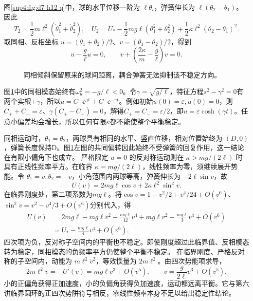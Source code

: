 \begin{solution}
图\ref{sup4:fig:d7-h12-q}中，球的水平位移一阶为 $\ell\theta_i$，弹簧伸长为 $\ell(\theta_2-\theta_1)$。因此
\[
T_2=\frac12m\ell^2(\dot\theta_1^2+\dot\theta_2^2),\quad
U_2=U_*-\frac12mg\ell(\theta_1^2+\theta_2^2)
+\frac12\kappa\ell^2(\theta_2-\theta_1)^2.
\]
取同相、反相坐标 $u=(\theta_1+\theta_2)/2$、$v=(\theta_1-\theta_2)/2$，得到
\[
\ddot u-\frac g\ell u=0,\qquad
\ddot v+\left(\frac{2\kappa}{m}-\frac g\ell\right)v=0.
\]
\begin{figure}[H]\centering
{}
\caption{同相倾斜保留原来的球间距离，耦合弹簧无法抑制该不稳定方向。}\label{sup4:fig:d7-h12-s}
\end{figure}
图\ref{sup4:fig:d7-h12-s}中的同相模态始终有$\omega_u^2=-g/\ell<0$。令$\gamma=\sqrt{g/\ell}$，特征方程$s^2-\gamma^2=0$有两个实根$\pm\gamma$，所以$u=C_+\ee^{\gamma t}+C_-\ee^{-\gamma t}$。例如初始$u(0)=\varepsilon,\dot u(0)=0$，则$C_++C_-=\varepsilon$、$\gamma(C_+-C_-)=0$，解得$C_+=C_-=\varepsilon/2$，即$u=\varepsilon\cosh(\gamma t)$。任意小偏差均会增长，所以任何有限$\kappa$都不能使整个平衡稳定。

同相运动时，$\theta_1=\theta_2$，两球具有相同的水平、竖直位移，相对位置始终为 $(D,0)$，弹簧长度保持D。图\ref{sup4:fig:d7-h12-s}左图的共同偏转因此始终不受弹簧的回复作用，这一结论在有限小偏角下也成立。
严格限定 $u=0$ 的反对称运动则在 $\kappa>mg/(2\ell)$ 时具有正线性频率平方。在临界 $\kappa=mg/(2\ell)$，线性频率为零，须继续展开势能。令 $\theta_1=v,\theta_2=-v$，小角范围内两球等高，弹簧伸长为 $-2\ell\sin v$，故
\[
U(v)=2mg\ell\cos v+2\kappa\ell^2\sin^2v.
\]
在临界刚度处，第二项系数为$mg\ell$。将$\cos v=1-v^2/2+v^4/24+O(v^6)$、$\sin^2v=v^2-v^4/3+O(v^6)$分别代入，得
\[
\begin{aligned}
U(v)&=2mg\ell-mg\ell v^2+\frac{mg\ell}{12}v^4
+mg\ell v^2-\frac{mg\ell}{3}v^4+O(v^6)\\
&=U_*-\frac{mg\ell}{4}v^4+O(v^6).
\end{aligned}
\]
四次项为负，反对称子空间内的平衡也不稳定。即使刚度超过此临界值、反相模态转为稳定，同相模态的负频率平方仍使整个平衡不稳定。
在临界刚度、严格反对称的子空间内，动能为 $m\ell^2\dot v^2$，等效惯量为 $2m\ell^2$。由四次势能项求导，
\[
2m\ell^2\ddot v=-U'(v)=mg\ell v^3+O(v^5),
\qquad \ddot v=\frac g{2\ell}v^3+O(v^5).
\]
小的正偏角获得正加速度，小的负偏角获得负加速度，运动都远离平衡。它与第六讲临界圆环的正四次势阱符号相反，零线性频率本身不足以给出稳定性结论。
\end{solution}


